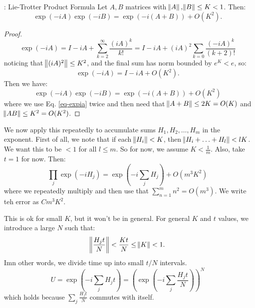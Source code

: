 \begin{lembox}{: Lie-Trotter Product Formula}
    Let $A, B$ matrices with $\norm{A}, \norm{B} \leq K < 1$. Then:
    \begin{equation}
        \exp(-iA)\exp(-iB) = \exp(-i(A+B)) + O(K^2).
    \end{equation}
\end{lembox}
\begin{proof}
    \begin{equation}
        \exp(-iA) = I - iA + \sum_{k=2}^{\infty}\frac{(iA)^k}{k!} = I - iA + (iA)^2\sum_{k=0}\frac{(-iA)^k}{(k+2)!}
    \end{equation}
    noticing that $\norm{(iA)^2} \leq K^2$, and the final sum has norm bounded by $e^K < e$, so:
    \begin{equation}\label{eq-expia}
        \exp(-iA) = I - iA + O(K^2).
    \end{equation}
    Then we have:
    \begin{equation}
        \exp(-iA)\exp(-iB) = \exp(-i(A+B)) + O(K^2)
    \end{equation}
    where we use Eq. \eqref{eq-expia} twice and then need that $\norm{A + B} \leq 2K = O(K)$ and $\norm{AB} \leq K^2 = O(K^2)$.
\end{proof}

We now apply this repeatedly to accumulate sums $H_1, H_2, \ldots, H_m$ in the exponent. First of all, we note that if each $\norm{H_i} < K$, then $\norm{H_i + \ldots + H_l} < lK$. We want this to be $< 1$ for all $l \leq m$. So for now, we assume $K < \frac{1}{m}$. Also, take $t = 1$ for now. Then:
\begin{equation}
    \prod_{j}\exp(-iH_j) = \exp(-i\sum_j H_j) + O(m^3K^2)
\end{equation}
where we repeatedly multiply and then use that $\sum_{n=1}^m n^2 = O(m^3)$. We write teh error as $Cm^3K^2$. 

This is ok for small $K$, but it won't be in general. For general $K$ and $t$ values, we introduce a large $N$ such that:
\begin{equation}
    \norm{\frac{H_jt}{N}} < \frac{Kt}{N} \leq \norm{K} < 1.
\end{equation}
Imn other words, we divide time up into small $t/N$ intervals.
\begin{equation}
    U = \exp(-i\sum_j H_j t) = (\exp(-i\sum_j \frac{H_j t}{N}))^N
\end{equation}
which holds because $\sum_j \frac{H_j t}{N}$ commutes with itself.

